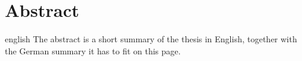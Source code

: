 \thispagestyle{plain}

\section*{Abstract}
\begin{foreignlanguage}{english}
The abstract is a short summary of the thesis in English, together with the German summary it has to fit on this page.
\end{foreignlanguage}
